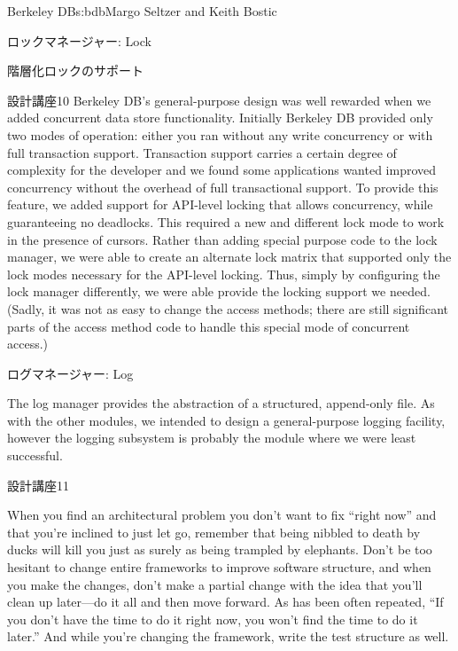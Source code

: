 \begin{aosachapter}{Berkeley DB}{s:bdb}{Margo Seltzer and Keith Bostic}
\begin{aosasect1}{ロックマネージャー: Lock}
\begin{aosasect2}{階層化ロックのサポート}
\begin{aosabox}{設計講座10}
Berkeley DB's general-purpose design was well rewarded when we added
concurrent data store functionality. Initially Berkeley
DB provided only two modes of operation: either you ran without any
write concurrency or with full transaction support. Transaction
support carries a certain degree of complexity for the developer and
we found some applications wanted improved concurrency without the
overhead of full transactional support. To provide this feature, we
added support for API-level locking that allows concurrency, while
guaranteeing no deadlocks.  This required a new and different lock
mode to work in the presence of cursors. Rather than adding special
purpose code to the lock manager, we were able to create an alternate
lock matrix that supported only the lock modes necessary for the
API-level locking.  Thus, simply by configuring the lock manager
differently, we were able provide the locking support we
needed. (Sadly, it was not as easy to change the access methods; there
are still significant parts of the access method code to handle this
special mode of concurrent access.)

\end{aosabox}

\end{aosasect2}

\end{aosasect1}

\begin{aosasect1}{ログマネージャー: Log}
\label{sec.bdb.log}

The log manager provides the abstraction of a structured, append-only
file. As with the other modules, we intended to design a
general-purpose logging facility, however the logging subsystem is
probably the module where we were least successful. 

\begin{aosabox}{設計講座11}

When you find an architectural problem you don't want to fix ``right
now'' and that you're inclined to just let go, remember that being
nibbled to death by ducks will kill you just as surely as being
trampled by elephants. Don't be too hesitant to change entire
frameworks to improve software structure, and when you make the
changes, don't make a partial change with the idea that you'll clean
up later---do it all and then move forward. As has been often
repeated, ``If you don't have the time to do it right now, you won't
find the time to do it later.'' And while you're changing the
framework, write the test structure as well.


\end{aosabox}
\end{aosasect1}
\end{aosachapter}
